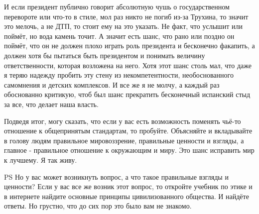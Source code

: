 И если президент публично говорит абсолютную чушь о государственном перевороте
или что-то в стиле, мол раз никто не погиб из-за Трухина, то значит это мелочь,
а не ДТП, то стоит ему на это указать. Не факт, что услышит или поймёт, но вода
камень точит. А значит есть шанс, что рано или поздно он поймёт, что он не
должен плохо играть роль президента и бесконечно факапить, а должен хотя бы
пытаться быть президентом и понимать величину ответственности, которая
возложена на него. Хотя этот шанс столь мал, что даже я теряю надежду пробить
эту стену из некомпетентности, необоснованного самомнения и детских комплексов.
И все же я не молчу, а каждый раз обоснованно критикую, чтоб был шанс
прекратить бесконечный испанский стыд за все, что делает наша власть. 

Подведя итог, могу сказать, что если у вас есть возможность поменять чьё-то
отношение к общепринятым стандартам, то пробуйте. Объясняйте и вкладывайте в
голову людям правильное мировоззрение, правильные ценности и взгляды, а главное
- правильное отношение к окружающим и миру. Это шанс исправить мир к лучшему. Я
так живу.

PS Но у вас может возникнуть вопрос, а что такое правильные взгляды и ценности?
Если у вас все же возник этот вопрос, то откройте учебник по этике и в
интернете найдите основные принципы цивилизованного общества. И найдёте ответы.
Но грустно, что до сих пор это было вам не знакомо.
